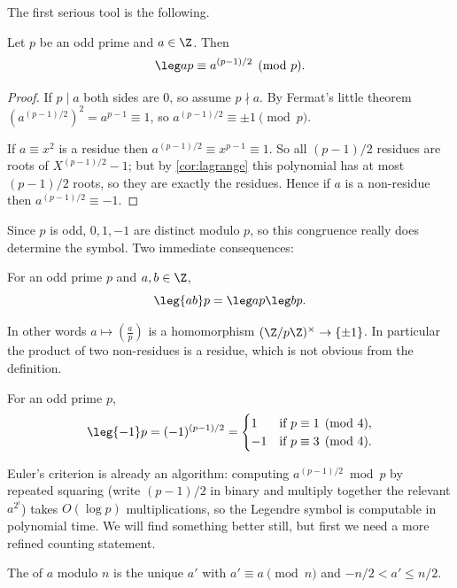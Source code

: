 The first serious tool is the following.

\begin{theorem}\label{nt-thm:euler}
	Let $p$ be an odd prime and $a \in \Z$. Then
	$$
	\leg ap \equiv a^{(p-1)/2} \pmod p.
	$$
\end{theorem}
\begin{proof}
	If $p \mid a$ both sides are $0$, so assume $p \nmid a$. By Fermat's little theorem $(a^{(p-1)/2})^2 = a^{p-1} \equiv 1$, so $a^{(p-1)/2} \equiv \pm 1 \pmod p$.

	If $a \equiv x^2$ is a residue then $a^{(p-1)/2} \equiv x^{p-1} \equiv 1$. So all $(p-1)/2$ residues are roots of $X^{(p-1)/2} - 1$; but by \autoref{cor:lagrange} this polynomial has at most $(p-1)/2$ roots, so they are exactly the residues. Hence if $a$ is a non-residue then $a^{(p-1)/2} \equiv -1$.
\end{proof}

Since $p$ is odd, $0, 1, -1$ are distinct modulo $p$, so this congruence really does determine the symbol. Two immediate consequences:

\begin{corollary}\label{cor:multiplicative}
	For an odd prime $p$ and $a, b \in \Z$,
	$$
	\leg{ab}p = \leg ap \leg bp.
	$$
\end{corollary}

In other words $a \mapsto \left( \frac ap \right)$ is a homomorphism $(\Z/p\Z)^\times \to \{\pm 1\}$. In particular the product of two non-residues is a residue, which is not obvious from the definition.

\begin{corollary}\label{cor:minusone}
	For an odd prime $p$,
	$$
	\leg{-1}p = (-1)^{(p-1)/2} = \begin{cases}
		1 & \text{if } p \equiv 1 \pmod 4, \\
		-1 & \text{if } p \equiv 3 \pmod 4.
	\end{cases}
	$$
\end{corollary}

Euler's criterion is already an algorithm: computing $a^{(p-1)/2} \bmod p$ by repeated squaring (write $(p-1)/2$ in binary and multiply together the relevant $a^{2^i}$) takes $O(\log p)$ multiplications, so the Legendre symbol is computable in polynomial time. We will find something better still, but first we need a more refined counting statement.

\begin{definition}
	The  of $a$ modulo $n$ is the unique $a'$ with $a' \equiv a \pmod n$ and $-n/2 < a' \leq n/2$.
\end{definition}

